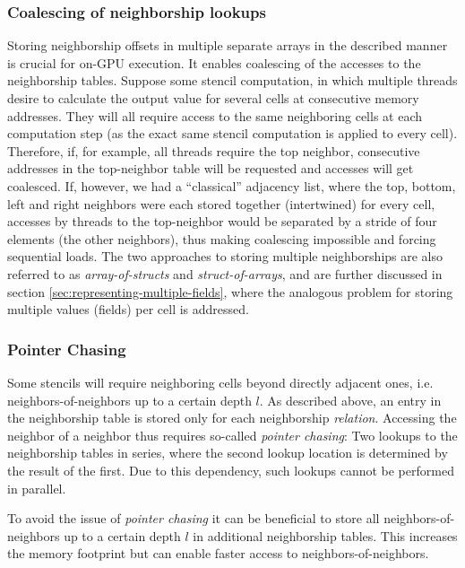 \subsubsection{Coalescing of neighborship lookups}

Storing neighborship offsets in multiple separate arrays in the described manner is crucial for on-GPU execution. It enables coalescing of the accesses to the neighborship tables. Suppose some stencil computation, in which multiple threads desire to calculate the output value for several cells at consecutive memory addresses. They will all require access to the same neighboring cells at each computation step (as the exact same stencil computation is applied to every cell). Therefore, if, for example, all threads require the top neighbor, consecutive addresses in the top-neighbor table will be requested and accesses will get coalesced. If, however, we had a ``classical'' adjacency list, where the top, bottom, left and right neighbors were each stored together (intertwined) for every cell, accesses by threads to the top-neighbor would be separated by a stride of four elements (the other neighbors), thus making coalescing impossible and forcing sequential loads. The two approaches to storing multiple neighborships are also referred to as \emph{array-of-structs} and \emph{struct-of-arrays}, and are further discussed in section \ref{sec:representing-multiple-fields}, where the analogous problem for storing multiple values (fields) per cell is addressed.

\subsubsection{Pointer Chasing}

Some stencils will require neighboring cells beyond directly adjacent ones, i.e. neighbors-of-neighbors up to a certain depth $l$. As described above, an entry in the neighborship table is stored only for each neighborship \emph{relation}. Accessing the neighbor of a neighbor thus requires so-called \emph{pointer chasing}: Two lookups to the neighborship tables in series, where the second lookup location is determined by the result of the first. Due to this dependency, such lookups cannot be performed in parallel.

To avoid the issue of \emph{pointer chasing} it can be beneficial to store all neighbors-of-neighbors up to a certain depth $l$ in additional neighborship tables. This increases the memory footprint but can enable faster access to neighbors-of-neighbors.

